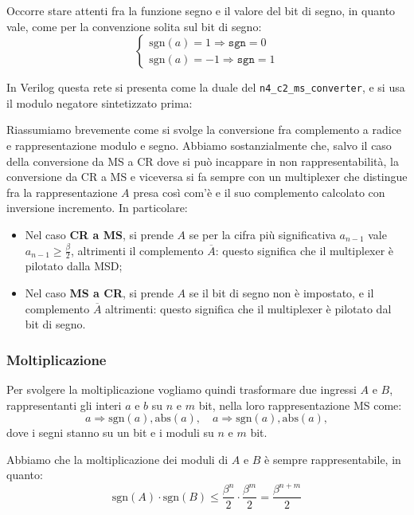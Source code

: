 \documentclass[a4paper,11pt]{article}
\begin{document}
Occorre stare attenti fra la funzione segno e il valore del bit di segno, in quanto vale, come per la convenzione solita sul bit di segno:
\[
	\begin{cases}			
\mathrm{sgn}(a) = 1 \Rightarrow \mathtt{sgn} = 0 \\
\mathrm{sgn}(a) = -1 \Rightarrow \mathtt{sgn} = 1
	\end{cases}
\]

In Verilog questa rete si presenta come la duale del \lstinline|n4_c2_ms_converter|, e si usa il modulo negatore sintetizzato prima:



\par\medskip

Riassumiamo brevemente come si svolge la conversione fra complemento a radice e rappresentazione modulo e segno.
Abbiamo sostanzialmente che, salvo il caso della conversione da MS a CR dove si può incappare in non rappresentabilità, la conversione da CR a MS e viceversa si fa sempre con un multiplexer che distingue fra la rappresentazione $A$ presa così com'è e il suo complemento calcolato con inversione incremento. 
In particolare:
\begin{itemize}
	\item Nel caso \textbf{CR a MS}, si prende $A$ se per la cifra più significativa $a_{n-1}$ vale $a_{n-1} \geq \frac{\beta}{2}$, altrimenti il complemento $\overline{A}$: questo significa che il multiplexer è pilotato dalla MSD;
	\item Nel caso \textbf{MS a CR}, si prende $A$ se il bit di segno non è impostato, e il complemento $\overline{A}$ altrimenti: questo significa che il multiplexer è pilotato dal bit di segno.
\end{itemize}

\subsubsection{Moltiplicazione}
Per svolgere la moltiplicazione vogliamo quindi trasformare due ingressi $A$ e $B$, rappresentanti gli interi $a$ e $b$ su $n$ e $m$ bit, nella loro rappresentazione MS come:
$$
a \Rightarrow \mathrm{sgn}(a), \mathrm{abs}(a), \quad 
a \Rightarrow \mathrm{sgn}(a), \mathrm{abs}(a), 
$$
dove i segni stanno su un bit e i moduli su $n$ e $m$ bit.

Abbiamo che la moltiplicazione dei moduli di $A$ e $B$ è sempre rappresentabile, in quanto:
$$
\mathrm{sgn}(A) \cdot \mathrm{sgn}(B) \leq \frac{\beta^n}{2} \cdot \frac{\beta^m}{2} = \frac{\beta^{n+m}}{2}
$$
\end{document}

